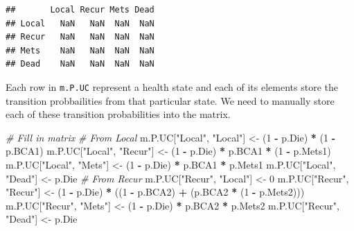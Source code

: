 \documentclass[]{article}
\newenvironment{Shaded}{\begin{snugshade}}{\end{snugshade}}
\newcommand{\DecValTok}[1]{\textcolor[rgb]{0.00,0.00,0.81}{#1}}
\newcommand{\StringTok}[1]{\textcolor[rgb]{0.31,0.60,0.02}{#1}}
\newcommand{\CommentTok}[1]{\textcolor[rgb]{0.56,0.35,0.01}{\textit{#1}}}
\newcommand{\OperatorTok}[1]{\textcolor[rgb]{0.81,0.36,0.00}{\textbf{#1}}}
\newcommand{\NormalTok}[1]{#1}
\theoremstyle{definition}
\theoremstyle{definition}
\theoremstyle{definition}
\theoremstyle{remark}
\begin{document}
\begin{verbatim}
##       Local Recur Mets Dead
## Local   NaN   NaN  NaN  NaN
## Recur   NaN   NaN  NaN  NaN
## Mets    NaN   NaN  NaN  NaN
## Dead    NaN   NaN  NaN  NaN
\end{verbatim}

Each row in \texttt{m.P.UC} represent a health state and each of its
elements store the transition probbailities from that particular state.
We need to manually store each of these transition probabilities into
the matrix.

\begin{Shaded}
\begin{Highlighting}[]
\CommentTok{# Fill in matrix}
\CommentTok{# From Local}
\NormalTok{m.P.UC[}\StringTok{"Local"}\NormalTok{, }\StringTok{"Local"}\NormalTok{] <-}\StringTok{ }\NormalTok{(}\DecValTok{1} \OperatorTok{-}\StringTok{ }\NormalTok{p.Die) }\OperatorTok{*}\StringTok{ }\NormalTok{(}\DecValTok{1} \OperatorTok{-}\StringTok{ }\NormalTok{p.BCA1)}
\NormalTok{m.P.UC[}\StringTok{"Local"}\NormalTok{, }\StringTok{"Recur"}\NormalTok{] <-}\StringTok{ }\NormalTok{(}\DecValTok{1} \OperatorTok{-}\StringTok{ }\NormalTok{p.Die) }\OperatorTok{*}\StringTok{ }\NormalTok{p.BCA1 }\OperatorTok{*}\StringTok{ }\NormalTok{(}\DecValTok{1} \OperatorTok{-}\StringTok{ }\NormalTok{p.Mets1) }
\NormalTok{m.P.UC[}\StringTok{"Local"}\NormalTok{, }\StringTok{"Mets"}\NormalTok{]  <-}\StringTok{ }\NormalTok{(}\DecValTok{1} \OperatorTok{-}\StringTok{ }\NormalTok{p.Die) }\OperatorTok{*}\StringTok{ }\NormalTok{p.BCA1 }\OperatorTok{*}\StringTok{ }\NormalTok{p.Mets1}
\NormalTok{m.P.UC[}\StringTok{"Local"}\NormalTok{, }\StringTok{"Dead"}\NormalTok{]  <-}\StringTok{ }\NormalTok{p.Die}
\CommentTok{# From Recur}
\NormalTok{m.P.UC[}\StringTok{"Recur"}\NormalTok{, }\StringTok{"Local"}\NormalTok{] <-}\StringTok{ }\DecValTok{0}
\NormalTok{m.P.UC[}\StringTok{"Recur"}\NormalTok{, }\StringTok{"Recur"}\NormalTok{] <-}\StringTok{ }\NormalTok{(}\DecValTok{1} \OperatorTok{-}\StringTok{ }\NormalTok{p.Die) }\OperatorTok{*}\StringTok{ }\NormalTok{((}\DecValTok{1} \OperatorTok{-}\StringTok{ }\NormalTok{p.BCA2) }\OperatorTok{+}\StringTok{ }\NormalTok{(p.BCA2 }\OperatorTok{*}\StringTok{ }\NormalTok{(}\DecValTok{1} \OperatorTok{-}\StringTok{ }\NormalTok{p.Mets2)))}
\NormalTok{m.P.UC[}\StringTok{"Recur"}\NormalTok{, }\StringTok{"Mets"}\NormalTok{]  <-}\StringTok{ }\NormalTok{(}\DecValTok{1} \OperatorTok{-}\StringTok{ }\NormalTok{p.Die) }\OperatorTok{*}\StringTok{ }\NormalTok{p.BCA2 }\OperatorTok{*}\StringTok{ }\NormalTok{p.Mets2}
\NormalTok{m.P.UC[}\StringTok{"Recur"}\NormalTok{, }\StringTok{"Dead"}\NormalTok{]  <-}\StringTok{ }\NormalTok{p.Die}

\end{Highlighting}
\end{Shaded}
\end{document}
